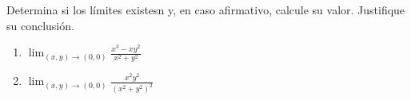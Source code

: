 Determina si los límites existesn y, en caso afirmativo, calcule su valor. Justifique su conclusión.
\begin{enumerate}
    \item $\displaystyle\lim_{(x,y)\to(0,0)} \frac{x^3 - xy^2}{x^2 + y^2}$
    \item $\displaystyle\lim_{(x,y)\to(0,0)} \frac{x^2 y^2}{(x^2 + y^2)^2}$
\end{enumerate}
